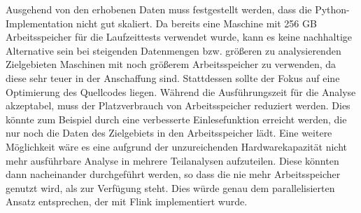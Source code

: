 Ausgehend von den erhobenen Daten muss festgestellt werden, dass die Python-Implementation nicht gut skaliert. Da bereits eine Maschine mit 256 GB Arbeitsspeicher für die Laufzeittests verwendet wurde, kann es keine nachhaltige Alternative sein bei steigenden Datenmengen bzw. größeren zu analysierenden Zielgebieten Maschinen mit noch größerem Arbeitsspeicher zu verwenden, da diese sehr teuer in der Anschaffung sind. Stattdessen sollte der Fokus auf eine Optimierung des Quellcodes liegen. Während die Ausführungszeit für die Analyse akzeptabel, muss der Platzverbrauch von Arbeitsspeicher reduziert werden. Dies könnte zum Beispiel durch eine verbesserte Einlesefunktion erreicht werden, die nur noch die Daten des Zielgebiets in den Arbeitsspeicher lädt. Eine weitere Möglichkeit wäre es eine aufgrund der unzureichenden Hardwarekapazität nicht mehr ausführbare Analyse in mehrere Teilanalysen aufzuteilen. Diese könnten dann nacheinander durchgeführt werden, so dass die nie mehr Arbeitsspeicher genutzt wird, als zur Verfügung steht. Dies würde genau dem parallelisierten Ansatz entsprechen, der mit Flink implementiert wurde.

